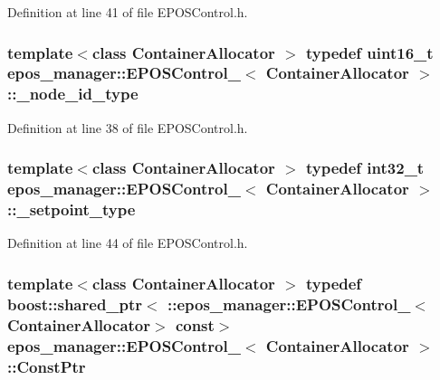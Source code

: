 \-Definition at line 41 of file \-E\-P\-O\-S\-Control.\-h.

\subsubsection[{\-\_\-node\-\_\-id\-\_\-type}]{\setlength{\rightskip}{0pt plus 5cm}template$<$class Container\-Allocator $>$ typedef uint16\-\_\-t {\bf epos\-\_\-manager\-::\-E\-P\-O\-S\-Control\-\_\-}$<$ \-Container\-Allocator $>$\-::{\bf \-\_\-node\-\_\-id\-\_\-type}}\label{structepos__manager_1_1EPOSControl___a80e73ce0d0ad73c3b7650cc02edba391}


\-Definition at line 38 of file \-E\-P\-O\-S\-Control.\-h.

\subsubsection[{\-\_\-setpoint\-\_\-type}]{\setlength{\rightskip}{0pt plus 5cm}template$<$class Container\-Allocator $>$ typedef int32\-\_\-t {\bf epos\-\_\-manager\-::\-E\-P\-O\-S\-Control\-\_\-}$<$ \-Container\-Allocator $>$\-::{\bf \-\_\-setpoint\-\_\-type}}\label{structepos__manager_1_1EPOSControl___a983d5a907adf64dfdfbe923c92387f1f}


\-Definition at line 44 of file \-E\-P\-O\-S\-Control.\-h.

\subsubsection[{\-Const\-Ptr}]{\setlength{\rightskip}{0pt plus 5cm}template$<$class Container\-Allocator $>$ typedef boost\-::shared\-\_\-ptr$<$ \-::{\bf epos\-\_\-manager\-::\-E\-P\-O\-S\-Control\-\_\-}$<$\-Container\-Allocator$>$ const$>$ {\bf epos\-\_\-manager\-::\-E\-P\-O\-S\-Control\-\_\-}$<$ \-Container\-Allocator $>$\-::{\bf \-Const\-Ptr}}\label{structepos__manager_1_1EPOSControl___a6a11f64719f4d3b81ea646c62876e220}


